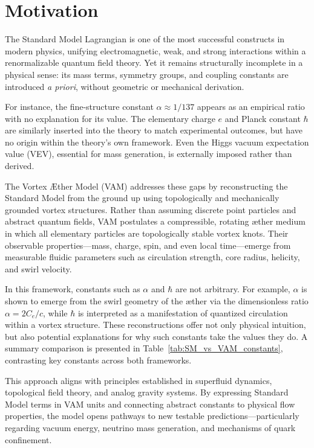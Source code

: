 \section{Motivation}

The Standard Model Lagrangian is one of the most successful constructs in modern physics, unifying electromagnetic, weak, and strong interactions within a renormalizable quantum field theory. Yet it remains structurally incomplete in a physical sense: its mass terms, symmetry groups, and coupling constants are introduced \textit{a priori}, without geometric or mechanical derivation.

For instance, the fine-structure constant $\alpha \approx 1/137$ appears as an empirical ratio with no explanation for its value. The elementary charge $e$ and Planck constant $\hbar$ are similarly inserted into the theory to match experimental outcomes, but have no origin within the theory’s own framework. Even the Higgs vacuum expectation value (VEV), essential for mass generation, is externally imposed rather than derived.

The Vortex Æther Model (VAM) addresses these gaps by reconstructing the Standard Model from the ground up using topologically and mechanically grounded vortex structures. Rather than assuming discrete point particles and abstract quantum fields, VAM postulates a compressible, rotating æther medium in which all elementary particles are topologically stable vortex knots. Their observable properties—mass, charge, spin, and even local time—emerge from measurable fluidic parameters such as circulation strength, core radius, helicity, and swirl velocity.

In this framework, constants such as $\alpha$ and $\hbar$ are not arbitrary. For example, $\alpha$ is shown to emerge from the swirl geometry of the æther via the dimensionless ratio $\alpha = 2C_e / c$, while $\hbar$ is interpreted as a manifestation of quantized circulation within a vortex structure. These reconstructions offer not only physical intuition, but also potential explanations for why such constants take the values they do. A summary comparison is presented in Table~\ref{tab:SM_vs_VAM_constants}, contrasting key constants across both frameworks.

This approach aligns with principles established in superfluid dynamics, topological field theory, and analog gravity systems. By expressing Standard Model terms in VAM units and connecting abstract constants to physical flow properties, the model opens pathways to new testable predictions—particularly regarding vacuum energy, neutrino mass generation, and mechanisms of quark confinement.




